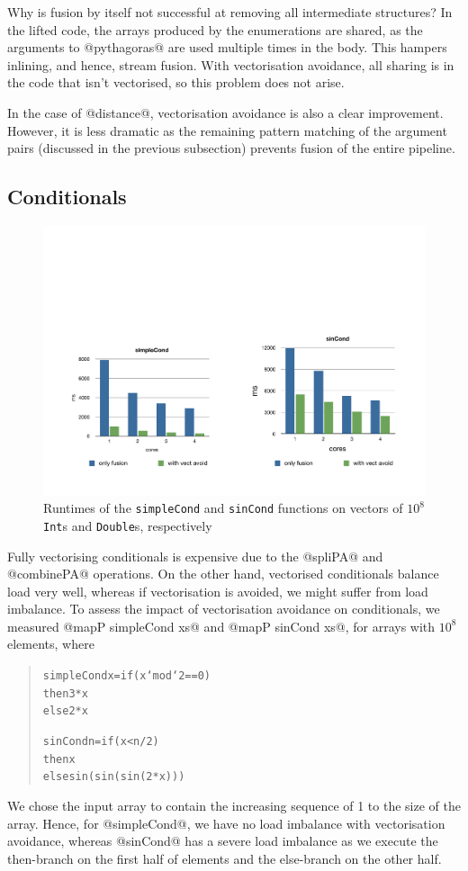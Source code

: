 Why is fusion by itself not successful at removing all intermediate structures? In the lifted code, the arrays produced by the enumerations are shared, as the arguments to @pythagoras@ are used multiple times in the body. This hampers inlining, and hence, stream fusion. With vectorisation avoidance, all sharing is in the code that isn't vectorised, so this problem does not arise.

In the case of @distance@, vectorisation avoidance is also a clear improvement. However, it is less dramatic as the remaining pattern matching of the argument pairs (discussed in the previous subsection) prevents fusion of the entire pipeline.

\subsection{Conditionals}

\begin{figure}
\includegraphics[scale=0.6, trim=0cm 2cm 0cm 8cm, clip]{data/Conditional.pdf}
\caption{Runtimes of the \texttt{simpleCond} and \texttt{sinCond} functions on vectors of $10^8$ \texttt{Int}s and \texttt{Double}s, respectively}
\label{Figure:Conditional}
\end{figure}
%
Fully vectorising conditionals is expensive due to the @spliPA@ and @combinePA@ operations. On the other hand, vectorised conditionals balance load very well, whereas if vectorisation is avoided, we might suffer from load imbalance. To assess the impact of vectorisation avoidance on conditionals, we measured @mapP simpleCond xs@ and @mapP sinCond xs@, for arrays with $10^8$ elements, where
%
\begin{quote}\small
\begin{alltt}
simpleCond x = if (x `mod` 2 == 0) 
               then 3 * x 
               else 2 * x

sinCond n = if (x < n / 2) 
            then  x 
            else sin (sin (sin (2 * x)))
\end{alltt}
\end{quote}
%
We chose the input array to contain the increasing sequence of 1 to the size of the array. Hence, for @simpleCond@, we have no load imbalance with vectorisation avoidance, whereas @sinCond@ has a severe load imbalance as we execute the then-branch on the first half of elements and the else-branch on the other half.

